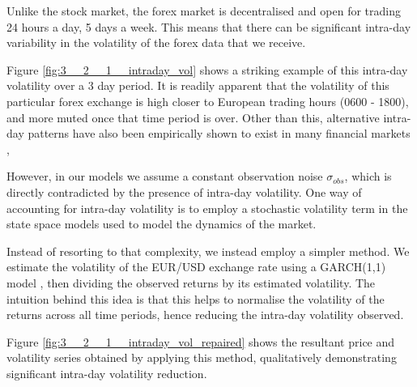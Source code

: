 \documentclass[../main.tex]{subfiles}
\begin{document}
Unlike the stock market, the forex market is decentralised and open for trading 24 hours a day, 5 days a week. This means that there can be significant intra-day variability in the volatility of the forex data that we receive. 

Figure \ref{fig:3__2__1__intraday_vol} shows a striking example of this intra-day volatility over a 3 day period. It is readily apparent that the volatility of this particular forex exchange is high closer to European trading hours (0600 - 1800), and more muted once that time period is over. Other than this, alternative intra-day patterns have also been empirically shown to exist in many financial markets \cite{cheung1994intraday}, \cite{andersen2019time}

However, in our models we assume a constant observation noise $\sigma_{obs}$, which is directly contradicted by the presence of intra-day volatility. One way of accounting for intra-day volatility is to employ a stochastic volatility term in the state space models used to model the dynamics of the market. 

Instead of resorting to that complexity, we instead employ a simpler method. We estimate the volatility of the EUR/USD exchange rate using a GARCH(1,1) model \cite{zaffaroni2008large}, then dividing the observed returns by its estimated volatility. The intuition behind this idea is that this helps to normalise the volatility of the returns across all time periods, hence reducing the intra-day volatility observed. 

Figure \ref{fig:3__2__1__intraday_vol_repaired} shows the resultant price and volatility series obtained by applying this method, qualitatively demonstrating significant intra-day volatility reduction. 
\end{document}
